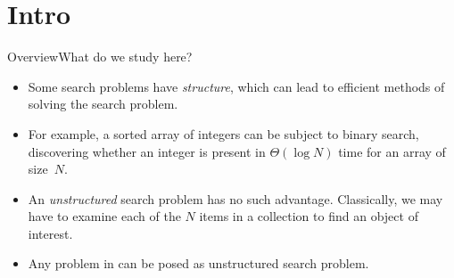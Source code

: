 
\section*{Intro}
\begin{frame}{Overview}{What do we study here?}

\begin{itemize}
    \item Some search problems have \emph{structure}, which can lead to efficient methods of solving the search problem.
    \item For example, a sorted array of integers can be subject to binary search, discovering whether an integer is present in $\Theta(\log{N})$ time for an array of size~$N$.
    \item An \emph{unstructured} search problem has no such advantage.  Classically, we may have to examine each of the $N$ items in a collection to find an object of interest.
    \item Any problem in \href{https://complexityzoo.net/Complexity_Zoo:N\#np}{} can be posed as unstructured search problem.
\end{itemize}
    
\end{frame}

